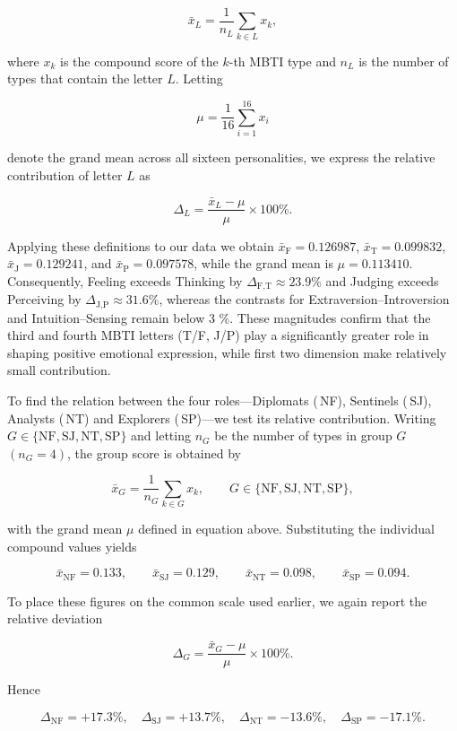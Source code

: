 \documentclass[12pt]{article}
\numberwithin{figure}{section}  %
\begin{document}
	$$
	\bar{x}_{L}=\frac{1}{n_{L}}\sum_{k\in L}x_{k},
	$$
	
	where $x_{k}$ is the compound score of the $k$-th MBTI type and $n_{L}$ is
	the number of types that contain the letter $L$.  Letting
	
	$$
	\mu=\frac{1}{16}\sum_{i=1}^{16}x_{i}
	$$
	
	denote the grand mean across all sixteen personalities, we express the
	relative contribution of letter $L$ as
	
	$$
	\Delta_{L}= \frac{\bar{x}_{L}-\mu}{\mu}\times100\%.
	$$
	
	Applying these definitions to our data we obtain
	$\bar{x}_{\text{F}}=0.126987$, $\bar{x}_{\text{T}}=0.099832$,
	$\bar{x}_{\text{J}}=0.129241$, and $\bar{x}_{\text{P}}=0.097578$, while the
	grand mean is $\mu=0.113410$.  Consequently, Feeling exceeds Thinking by
	$\Delta_{\text{F,T}}\approx 23.9\%$ and Judging exceeds Perceiving by
	$\Delta_{\text{J,P}}\approx 31.6\%$, whereas the contrasts for
	Extraversion–Introversion and Intuition–Sensing remain below 3 \%.  These
	magnitudes confirm that the third and fourth MBTI letters (T/F, J/P) play a
	significantly greater role in shaping positive emotional expression, while
	first two dimension make relatively small contribution.
	
	To find the relation between the four roles—Diplomats ( NF), Sentinels
	( SJ), Analysts ( NT) and Explorers ( SP)—we test its relative contribution.
	Writing $G\in\{\text{NF},\text{SJ},\text{NT},\text{SP}\}$ and letting
	$n_{G}$ be the number of types in group $G$ $(n_{G}=4)$, the group score is
	obtained by
	
	$$
	\bar{x}_{G}= \frac{1}{n_{G}}\sum_{k\in G}x_{k},
	\qquad
	G\in\{\text{NF},\text{SJ},\text{NT},\text{SP}\},
	$$
	
	with the grand mean $\mu$ defined in equation above.  Substituting the
	individual compound values yields
	
	$$
	\bar{x}_{\text{NF}} = 0.133,\qquad 
	\bar{x}_{\text{SJ}} = 0.129,\qquad
	\bar{x}_{\text{NT}} = 0.098,\qquad
	\bar{x}_{\text{SP}} = 0.094 .
	$$
	
	To place these figures on the common scale used earlier, we again report the
	relative deviation
	
	$$
	\Delta_{G}= \frac{\bar{x}_{G}-\mu}{\mu}\times 100\% .
	$$
	
	Hence
	
	$$
	\Delta_{\text{NF}}=+17.3\%,\quad 
	\Delta_{\text{SJ}}=+13.7\%,\quad
	\Delta_{\text{NT}}=-13.6\%,\quad
	\Delta_{\text{SP}}=-17.1\%.
	$$
	
\end{document}
